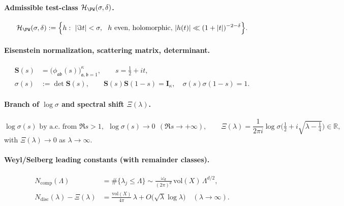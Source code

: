 \paragraph{Admissible test-class $\mathcal H_{\PW}(\sigma,\delta)$.}
\begin{equation}
  \mathcal H_{\PW}(\sigma,\delta):=\Big\{h:\ |\Im t|<\sigma,\ \ h\text{ even, holomorphic, } |h(t)|\ll(1+|t|)^{-2-\delta}\Big\}.
  \label{eq:HPW-max}
\end{equation}

\paragraph{Eisenstein normalization, scattering matrix, determinant.}
\begin{align}
  \mathbf S(s)&=\big(\phi_{\mathfrak a\mathfrak b}(s)\big)_{\mathfrak a,\mathfrak b=1}^\kappa,\qquad s=\tfrac12+it,\label{eq:S-matrix-max}\\
  \sigma(s)&:=\det \mathbf S(s),\qquad \mathbf S(s)\mathbf S(1-s)=\mathbf I_\kappa,\quad \sigma(s)\sigma(1-s)=1.
  \label{eq:sigma-def-max}
\end{align}

\paragraph{Branch of $\log\sigma$ and spectral shift $\Xi(\lambda)$.}
\begin{equation}
  \log\sigma(s)\text{ by a.c.\ from }\Re s>1,\ \ \log\sigma(s)\to 0\ \ (\Re s\to+\infty),\qquad
  \Xi(\lambda)=\frac{1}{2\pi i}\log\sigma\!\Big(\tfrac12+i\sqrt{\lambda-\tfrac14}\Big)\in\mathbb R,
  \label{eq:Xi-def-max}
\end{equation}
with $\Xi(\lambda)\to 0$ as $\lambda\to\infty$.

\paragraph{Weyl/Selberg leading constants (with remainder classes).}
\begin{align}
  N_{\mathrm{comp}}(\Lambda)&=\#\{\lambda_j\le\Lambda\}\sim \frac{\omega_d}{(2\pi)^d}\,\mathrm{vol}(X)\,\Lambda^{d/2},
  \label{eq:weyl-max}\\
  N_{\mathrm{disc}}(\lambda)-\Xi(\lambda)&=\frac{\mathrm{vol}(X)}{4\pi}\,\lambda+O\!\big(\sqrt{\lambda}\log\lambda\big)\quad (\lambda\to\infty).
  \label{eq:selberg-balanced-max}
\end{align}

